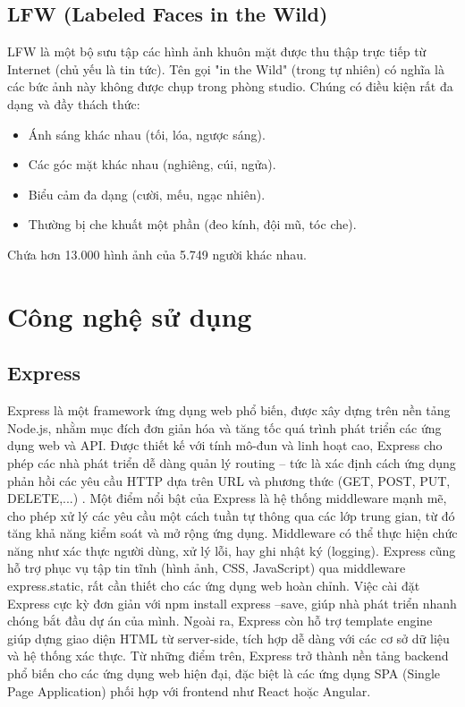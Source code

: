 \documentclass[../DoAn.tex]{subfiles}
\begin{document}
\subsection{LFW (Labeled Faces in the Wild)}
LFW \cite{huang:inria-00321923} là một bộ sưu tập các hình ảnh khuôn mặt được thu thập trực tiếp từ Internet (chủ yếu là tin tức). Tên gọi "in the Wild" (trong tự nhiên) có nghĩa là các bức ảnh này không được chụp trong phòng studio. Chúng có điều kiện rất đa dạng và đầy thách thức:
\begin{itemize}
	\item Ánh sáng khác nhau (tối, lóa, ngược sáng).
	\item Các góc mặt khác nhau (nghiêng, cúi, ngửa).
	\item Biểu cảm đa dạng (cười, mếu, ngạc nhiên).
	\item Thường bị che khuất một phần (đeo kính, đội mũ, tóc che).
\end{itemize}
Chứa hơn 13.000 hình ảnh của 5.749 người khác nhau.
\section{Công nghệ sử dụng}
\subsection{Express}
Express là một framework ứng dụng web phổ biến, được xây dựng trên nền tảng Node.js, nhằm mục đích đơn giản hóa và tăng tốc quá trình phát triển các ứng dụng web và API. Được thiết kế với tính mô-đun và linh hoạt cao, Express cho phép các nhà phát triển dễ dàng quản lý routing – tức là xác định cách ứng dụng phản hồi các yêu cầu HTTP dựa trên URL và phương thức (GET, POST, PUT, DELETE,...) \cite{expressjsExpressNodejs}. Một điểm nổi bật của Express là hệ thống middleware mạnh mẽ, cho phép xử lý các yêu cầu một cách tuần tự thông qua các lớp trung gian, từ đó tăng khả năng kiểm soát và mở rộng ứng dụng. Middleware có thể thực hiện chức năng như xác thực người dùng, xử lý lỗi, hay ghi nhật ký (logging). Express cũng hỗ trợ phục vụ tập tin tĩnh (hình ảnh, CSS, JavaScript) qua middleware express.static, rất cần thiết cho các ứng dụng web hoàn chỉnh. Việc cài đặt Express cực kỳ đơn giản với npm install express --save, giúp nhà phát triển nhanh chóng bắt đầu dự án của mình. Ngoài ra, Express còn hỗ trợ template engine giúp dựng giao diện HTML từ server-side, tích hợp dễ dàng với các cơ sở dữ liệu và hệ thống xác thực. Từ những điểm trên, Express trở thành nền tảng backend phổ biến cho các ứng dụng web hiện đại, đặc biệt là các ứng dụng SPA (Single Page Application) phối hợp với frontend như React hoặc Angular.
\end{document}
